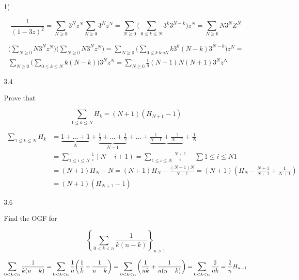\documentclass[12pt]{article}
\begin{document}
1)

\begin{equation}
    \frac{1}{(1-3z)^2} = \sum_{N \geq 0}3^Nz^N \sum_{N \geq 0}3^Nz^N = \sum_{N \geq 0} \bigg( \sum_{0 \leq k \leq N}3^k3^{N-k} \bigg) z^N = \sum_{N \geq 0}N3^NZ^N \nonumber
\end{equation}

\begin{equation}
\begin{split}
    \bigg(\sum_{N \geq 0}N3^Nz^N\bigg)\bigg(\sum_{N \geq 0}N3^Nz^N\bigg) = \sum_{N \geq 0} \bigg( \sum_{0 \leq k \ leq N}k3^k(N-k)3^{N-k} \bigg)z^N =\\
    \sum_{N \geq 0} \bigg( \sum_{0 \leq k \leq N}k(N - k) \bigg)3^Nz^N = \sum_{N \geq 0} \frac{1}{6}(N-1)N(N+1)3^Nz^N \nonumber
\end{split}
\end{equation}

3.4

Prove that

\begin{equation}
\sum_{1 \leq k \leq N} H_k = (N + 1)(H_{N + 1} - 1) \nonumber
\end{equation}

\begin{equation}
\begin{split}
\sum_{1 \leq k \leq N} H_k & = \underbrace{1 + \dots + 1}_{N} + \underbrace{\frac{1}{2} + \dots + \frac{1}{2}}_{N - 1} + \dots + \underbrace{\frac{1}{N-1} + \frac{1}{N-1}} + \frac{1}{N} \\
                           & = \sum_{1 \leq i \leq N}\frac{1}{i}(N - i + 1) = \sum_{1 \leq i \leq N}\frac{N+1}{i} - \sum{1 \leq i \leq N}1\\
                           & = (N + 1)H_N - N = (N + 1)H_N - \frac{(N + 1)N}{N + 1} = (N + 1)(H_N - \frac{N+1}{N+1} + \frac{1}{N+1})\\
                           & = (N + 1)(H_{N+1} - 1)\nonumber
\end{split}
\end{equation}


3.6

Find the OGF for

\begin{equation}
\left\{\sum_{0 < k < n} \frac{1}{k(n - k)}\right\}_{n > 1} \nonumber
\end{equation}

\begin{equation}
    \sum_{0 < k < n}\frac{1}{k(n-k)} = \sum_{0 < k < n}\frac{1}{n} \bigg( \frac{1}{k} + \frac{1}{n - k} \bigg)\\
    = \sum_{0 < k < n} \bigg( \frac{1}{nk} + \frac{1}{n(n-k)} \bigg)\\
    = \sum_{0 < k < n} \frac{2}{nk} = \frac{2}{n}H_{n-1} \nonumber
\end{equation}
\end{document}
